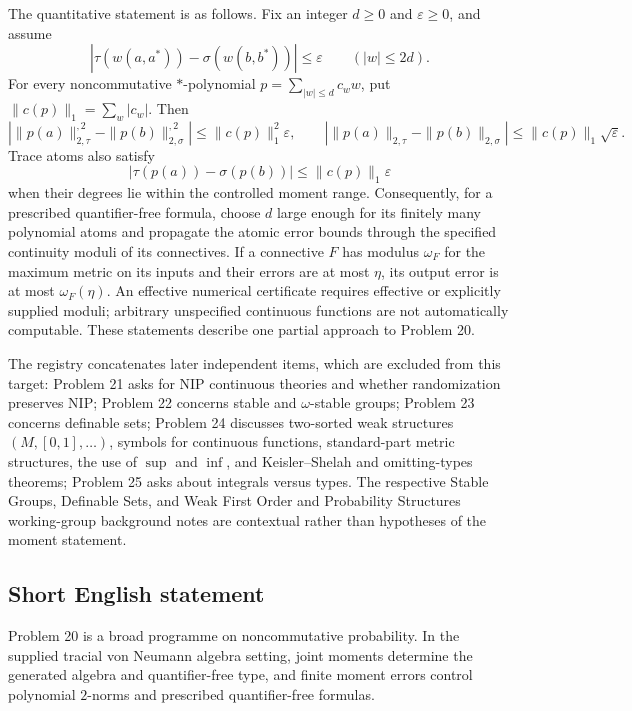 \documentclass[11pt]{article}
\begin{document}
The quantitative statement is as follows. Fix an integer \(d\ge0\) and \(\varepsilon\ge0\), and assume
\[
 |\tau(w(a,a^*))-\sigma(w(b,b^*))|\le\varepsilon
 \qquad(|w|\le2d).
\]
For every noncommutative \(*\)-polynomial \(p=\sum_{|w|\le d}c_w w\), put \(\|c(p)\|_1=\sum_w|c_w|\). Then
\[
 \left|\|p(a)\|_{2,\tau}^{,2}-\|p(b)\|_{2,\sigma}^{,2}\right|
 \le\|c(p)\|_1^2\varepsilon,
 \qquad
 \left|\|p(a)\|_{2,\tau}-\|p(b)\|_{2,\sigma}\right|
 \le\|c(p)\|_1\sqrt{\varepsilon}.
\]
Trace atoms also satisfy
\[
 |\tau(p(a))-\sigma(p(b))|\le\|c(p)\|_1\varepsilon
\]
when their degrees lie within the controlled moment range. Consequently, for a prescribed quantifier-free formula, choose \(d\) large enough for its finitely many polynomial atoms and propagate the atomic error bounds through the specified continuity moduli of its connectives. If a connective \(F\) has modulus \(\omega_F\) for the maximum metric on its inputs and their errors are at most \(\eta\), its output error is at most \(\omega_F(\eta)\). An effective numerical certificate requires effective or explicitly supplied moduli; arbitrary unspecified continuous functions are not automatically computable. These statements describe one partial approach to Problem 20.

The registry concatenates later independent items, which are excluded from this target: Problem 21 asks for NIP continuous theories and whether randomization preserves NIP; Problem 22 concerns stable and \(\omega\)-stable groups; Problem 23 concerns definable sets; Problem 24 discusses two-sorted weak structures \((M,[0,1],\ldots)\), symbols for continuous functions, standard-part metric structures, the use of \(\sup\) and \(\inf\), and Keisler--Shelah and omitting-types theorems; Problem 25 asks about integrals versus types. The respective Stable Groups, Definable Sets, and Weak First Order and Probability Structures working-group background notes are contextual rather than hypotheses of the moment statement.
\subsection{Short English statement}
Problem 20 is a broad programme on noncommutative probability. In the supplied tracial von Neumann algebra setting, joint moments determine the generated algebra and quantifier-free type, and finite moment errors control polynomial \(2\)-norms and prescribed quantifier-free formulas.
\end{document}
